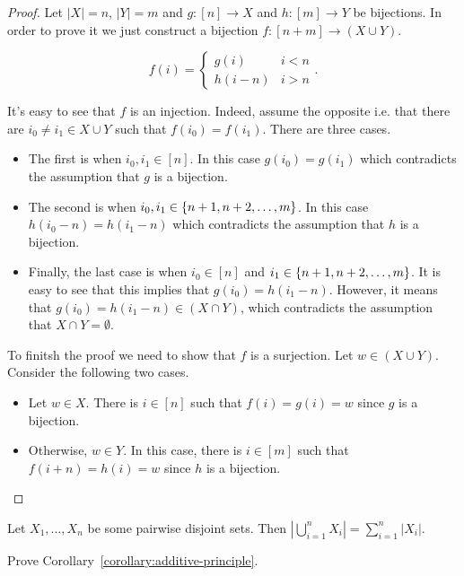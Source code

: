\begin{proof}
  Let $|X| = n$, $|Y| = m$ and $g : [n] \to X$ and $h : [m] \to Y$ be
  bijections. In order to prove it we just construct a bijection
  $f : [n + m] \to (X \cup Y)$.

  $$
    f(i) =
    \begin{cases}
        g(i) & i < n \\
        h(i  - n) & i > n
    \end{cases}.
  $$

  It's easy to see that $f$ is an injection. Indeed, assume the opposite i.e.
  that there are $i_0 \neq i_1 \in X \cup Y$ such that $f(i_0) = f(i_1)$.
  There are three cases.
  \begin{itemize}
    \item The first is when $i_0, i_1 \in [n]$. In this case $g(i_0) = g(i_1)$
      which contradicts the assumption that $g$ is a bijection.
    \item The second is when $i_0, i_1 \in \set{n + 1, n + 2, \dots, m}$.
      In this case $h(i_0 - n) = h(i_1 - n)$ which contradicts the assumption
      that $h$ is a bijection.
    \item Finally, the last case is when $i_0 \in [n]$ and
      $i_1 \in \set{n + 1, n + 2, \dots, m}$. It is easy to see that this
      implies that $g(i_0) = h(i_1 - n)$. However, it
      means that $g(i_0) = h(i_1 - n) \in (X \cap Y)$, which contradicts the
      assumption that $X \cap Y = \emptyset$.
  \end{itemize}

  To finitsh the proof we need to show that $f$ is a surjection. Let
  $w \in (X \cup Y)$. Consider the following two cases.
  \begin{itemize}
    \item Let $w \in X$. There is $i \in [n]$ such that $f(i) = g(i) = w$ since
      $g$ is a bijection.
    \item Otherwise, $w \in Y$. In this case, there is $i \in [m]$ such that
      $f(i + n) = h(i) = w$ since $h$ is a bijection.
  \end{itemize}
\end{proof}

\begin{corollary}
\label{corollary:additive-principle}
  Let $X_1, \dots, X_n$ be some pairwise disjoint sets. Then
  $\left|\bigcup_{i = 1}^n X_i\right| = \sum_{i = 1}^n |X_i|$.
\end{corollary}

\begin{exercise}
  Prove Corollary~\ref{corollary:additive-principle}.
\end{exercise}



